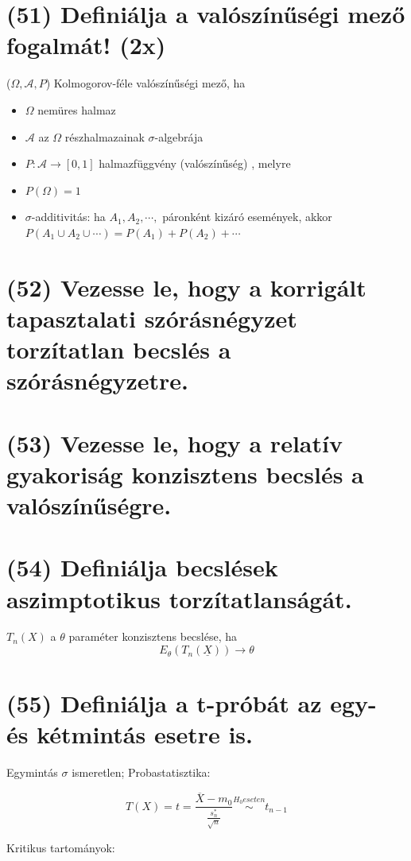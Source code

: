 \documentclass[12p]{article}
\begin{document}
\section{(51) Definiálja a valószínűségi mező fogalmát! (2x)}

($\Omega, \mathcal{A}, P$) Kolmogorov-féle
valószínűségi mező, ha
\begin{itemize}
	\item $\Omega$ nemüres halmaz
	\item $\mathcal{A}$ az $\Omega$ részhalmazainak $\sigma$-algebrája
	\item $P: \mathcal{A} \rightarrow [0, 1]$  halmazfüggvény
(valószínűség) , melyre
	\item $P(\Omega) = 1$
	\item $\sigma$-additivitás: ha $A_1, A_2,\cdots,$ páronként
kizáró események, akkor $P(A_1 \cup A_2 \cup \cdots) = P(A_1) + P(A_2) + \cdots$
\end{itemize}

\section{(52) Vezesse le, hogy a korrigált tapasztalati szórásnégyzet torzítatlan becslés a szórásnégyzetre. }

\section{(53) Vezesse le, hogy a relatív gyakoriság konzisztens becslés a valószínűségre.}

\section{(54) Definiálja becslések aszimptotikus torzítatlanságát.}

$T_n(X)$ a $\theta$ paraméter konzisztens becslése, ha
$$E_{\theta}(T_n(\underline{X})) \rightarrow \theta$$

\section{(55) Definiálja a t-próbát az egy- és kétmintás esetre is.}


Egymintás
$\sigma$ ismeretlen; Probastatisztika:

$$T(X) = t = \frac{\overline{X} - m_0}{\frac{s^{*}_n}{\sqrt{n}}} \stackrel{H_0 eseten}{\sim} t_{n-1}$$

Kritikus tartományok:
\end{document}
